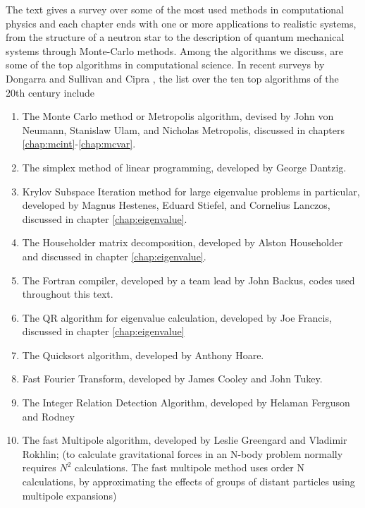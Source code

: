 The text gives a survey over some of the most used methods in
computational physics and each chapter ends with one or more 
applications to realistic systems, from the structure of a neutron
star to the description of quantum mechanical  systems through Monte-Carlo
methods. Among the algorithms we discuss, are some of the top algorithms in computational science.
In recent surveys by Dongarra and Sullivan \cite{top101} and Cipra \cite{top102}, 
the list over the ten top algorithms of the 20th century include 
\begin{enumerate}
\item The Monte Carlo method or Metropolis algorithm, devised by John von Neumann, Stanislaw Ulam, and Nicholas Metropolis,
discussed in chapters \ref{chap:mcint}-\ref{chap:mcvar}.
\item The simplex method of linear programming, developed by George Dantzig.
\item Krylov Subspace Iteration method for large eigenvalue problems in particular, 
developed by Magnus Hestenes, Eduard Stiefel, and Cornelius Lanczos, discussed in chapter 
\ref{chap:eigenvalue}.
\item The Householder matrix decomposition, developed by Alston Householder and discussed in chapter \ref{chap:eigenvalue}.
\item The Fortran compiler, developed by a team lead by John Backus, codes used throughout this text.
\item The QR algorithm for eigenvalue calculation, developed by Joe Francis, discussed in chapter \ref{chap:eigenvalue}
\item The Quicksort algorithm, developed by Anthony Hoare.
\item Fast Fourier Transform, developed by James Cooley and John Tukey.
\item The Integer Relation Detection Algorithm, developed by Helaman Ferguson and Rodney
\item The fast Multipole algorithm, developed by Leslie Greengard and Vladimir Rokhlin; 
(to calculate gravitational forces in an N-body problem normally requires $N^2$ calculations. 
The fast multipole method uses order N calculations, by approximating the effects of groups of distant 
particles using multipole expansions)
\end{enumerate}


